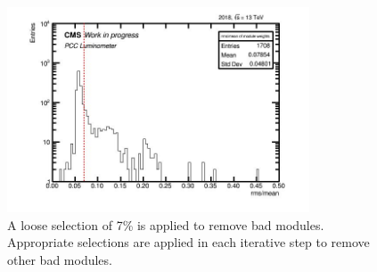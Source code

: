 

\begin{figure}[!htp]
\centering
\includegraphics[width=0.8\textwidth]{ashish_thesis/cut_selection_1.png}
\caption[First Iteration For Outlier Module Removal]{%
   A loose selection of 7\% is applied to remove bad modules. Appropriate selections are applied in each iterative step to remove other bad modules.
}
\label{fig:outliermodules}
\end{figure}

